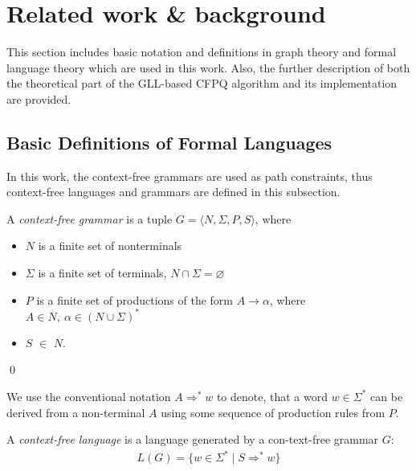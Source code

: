 \section{Related work \& background}
This section includes basic notation and definitions in graph theory and formal language theory which are used in this work. Also, the further description of both the theoretical part of the GLL-based CFPQ algorithm and its implementation are provided.

\subsection{Basic Definitions of Formal Languages}

In this work, the context-free grammars are used as path constraints, thus context-free languages and grammars are defined in this subsection.

\begin{rudefinition}A \emph{context-free grammar} is a tuple $G= \langle N, \Sigma, P, S \rangle$, where
\begin{itemize}
    \item $N$ is a finite set of nonterminals
    \item $\Sigma$ is a finite set of terminals, $N \cap \Sigma = \varnothing$
    \item $P$ is a finite set of productions of the form $A \to \alpha$, where $A \in N,\ \alpha \in (N \cup \Sigma)^*$
    \item $S$ $\in$ $N$.
\end{itemize} \qed
\end{rudefinition}

We use the conventional notation $A \Rightarrow^* w$ to denote, that a
word $w \in \Sigma^*$ can be derived from a non-terminal $A$ using some sequence of production rules from $P$.

\begin{rudefinition} A \emph{context-free language} is a language generated by a con-text-free grammar $G$:
\begin{align*}
     L(G) = \{w \in \Sigma^* \mid S \Rightarrow^* w \}
\end{align*}
\end{rudefinition}


